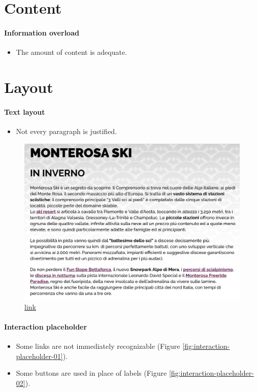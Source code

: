 \documentclass[a4paper, 11pt, parskip=half, headsepline]{scrreprt}
\begin{document}
\section{Content}

\paragraph{Information overload}
\begin{itemize}
    \item The amount of content is adequate.
\end{itemize}

 
\section{Layout}

\paragraph{Text layout}
\begin{itemize}
    \item Not every paragraph is justified.
\end{itemize}

\begin{figure}[H]
        \centering
        \includegraphics[width=0.5\linewidth, keepaspectratio]{71-textlayout}
        \caption{\href{https://www.visitmonterosa.com/monterosa-ski/}{link}}
        \label{fig:text-layout-01}
\end{figure}

\paragraph{Interaction placeholder}
\begin{itemize}
    \item Some links are not immediately recognizable (Figure \ref{fig:interaction-placeholder-01}).
    \item Some buttons are used in place of labels (Figure \ref{fig:interaction-placeholder-02}).
\end{itemize}
\end{document}
